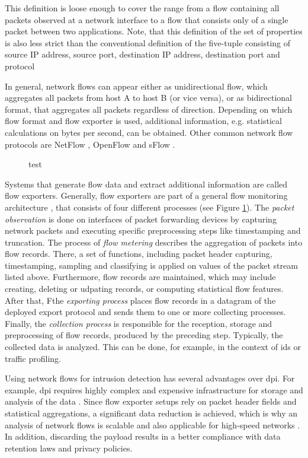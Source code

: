 This definition is loose enough to cover the range from a flow containing all packets observed at a network interface to a flow that consists only of a single packet between two applications. Note, that this definition of the set of properties is also less strict than the conventional definition of the five-tuple consisting of source IP address, source port, destination IP address, destination port and protocol \cite{rfc5101}

In general, network flows can appear either as unidirectional flow, which aggregates all packets from host A to host B (or vice versa), or as bidirectional format, that aggregates all packets regardless of direction. Depending on which flow format and flow exporter is used, additional information, e.g. statistical calculations on bytes per second, can be obtained. Other common network flow protocols are NetFlow \cite{rfc3954}, OpenFlow \cite{mck_2008} and sFlow \cite{pha_2004}.

\begin{figure}[t]
    \centering
    
    \caption{test}
    \label{fig:flow-export}
\end{figure}


Systems that generate flow data and extract additional information are called flow exporters. Generally, flow exporters are part of a general flow monitoring architecture \cite{hof_2014}, that consists of four different processes (see Figure \ref{fig:flow-export}). The \textit{packet observation} is done on interfaces of packet forwarding devices by capturing network packets and executing specific preprocessing steps like timestamping and truncation. The process of \textit{flow metering} describes the aggregation of packets into flow records. There, a set of functions, including packet header capturing, timestamping, sampling and classifying is applied on values of the packet stream listed above. Furthermore, flow records are  maintained, which may include creating, deleting or udpating records, or computing statistical flow features. After that, Fthe \textit{exporting process} places flow records in a datagram of the deployed export protocol and sends them to one or more collecting processes. Finally, the \textit{collection process} is responsible for the reception, storage and preprocessing of flow records, produced by the preceding step. Typically, the collected data is analyzed. This can be done, for example, in the context of \gls{ids} or traffic profiling.

Using network flows for intrusion detection has several advantages over \gls{dpi}. For example, \gls{dpi} requires highly complex and expensive infrastructure for storage and analysis of the data \cite{hof_2014}. Since flow exporter setups rely on packet header fields and statistical aggregations, a significant data reduction is achieved, which is why an analysis of network flows is scalable and also applicable for high-speed networks \cite{hof_2014}. In addition, discarding the payload results in a better compliance with data retention laws and privacy policies.